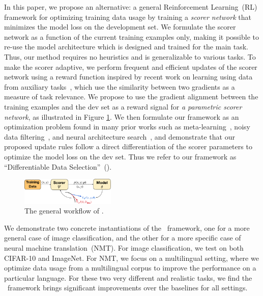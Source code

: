 In this paper, we propose an alternative: a general Reinforcement Learning~(RL) framework for optimizing training data usage by training a \emph{scorer network} that minimizes the model loss on the development set.
We formulate the scorer network as a function of the current training examples only,
making it possible to re-use the model architecture which is designed and trained for the main task. Thus, our method requires no heuristics and is generalizable to various tasks. To make the scorer adaptive, we perform frequent and efficient updates of the scorer network using a reward function inspired by recent work on learning using data from auxiliary tasks~\citep{cos_sim,meta_aux_learn}, which use the similarity between two gradients as a measure of task relevance.
We propose to use the gradient alignment between the training examples and the dev set as a reward signal for \emph{a parametric scorer network}, as illustrated in Figure \ref{fig:method}. We then formulate our framework as an optimization problem found in many prior works such as meta-learning~\citep{finn2017model}, noisy data filtering~\citep{learn_reweight}, and neural architecture search~\citep{darts}, and demonstrate that our proposed update rules follow a direct differentiation of the scorer parameters to optimize the model loss on the dev set.
Thus we refer to our framework as ``Differentiable Data Selection''~(\dds).

\begin{figure}
    \centering
    \includegraphics[width=0.4\textwidth]{figs/method_plot_crop.pdf}
    \caption{The general workflow of \dds.}
    \vspace{-0.5cm}
    \label{fig:method}
\end{figure}

We demonstrate two concrete instantiations of the \dds~framework, one for a more general case of image classification, and the other for a more specific case of neural machine translation~(NMT). For image classification, we test on both CIFAR-10 and ImageNet. For NMT, we focus on a multilingual setting, where we optimize data usage from a multilingual corpus to improve the performance on a particular language. %
For these two very different and realistic tasks, we find the \dds~framework brings significant improvements over the baselines for all settings.